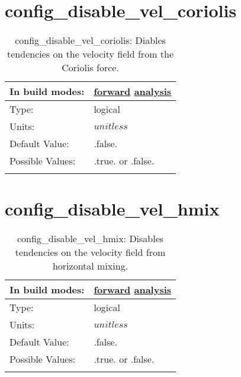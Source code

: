 \section[config\_disable\_vel\_coriolis]{config\_disable\_vel\_coriolis}
\label{sec:nm_sec_config_disable_vel_coriolis}
\begin{center}
\begin{longtable}{| p{2.0in} || p{4.0in} |}
    \hline
    In build modes: & \hyperref[subsec:forward_nm_tab_debug]{forward} \hyperref[subsec:analysis_nm_tab_debug]{analysis} \\
    \hline
    Type: & logical \\
    \hline
    Units: & $unitless$ \\
    \hline
    Default Value: & .false. \\
    \hline
    Possible Values: & .true. or .false. \\
    \hline
    \caption{config\_disable\_vel\_coriolis: Diables tendencies on the velocity field from the Coriolis force.}
\end{longtable}
\end{center}
\section[config\_disable\_vel\_hmix]{config\_disable\_vel\_hmix}
\label{sec:nm_sec_config_disable_vel_hmix}
\begin{center}
\begin{longtable}{| p{2.0in} || p{4.0in} |}
    \hline
    In build modes: & \hyperref[subsec:forward_nm_tab_debug]{forward} \hyperref[subsec:analysis_nm_tab_debug]{analysis} \\
    \hline
    Type: & logical \\
    \hline
    Units: & $unitless$ \\
    \hline
    Default Value: & .false. \\
    \hline
    Possible Values: & .true. or .false. \\
    \hline
    \caption{config\_disable\_vel\_hmix: Disables tendencies on the velocity field from horizontal mixing.}
\end{longtable}
\end{center}
